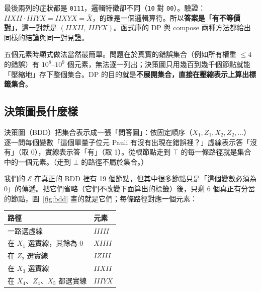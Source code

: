 \documentclass[a4paper,11pt,fontset=none]{ctexart}
\renewcommand{\emph}[1]{\textbf{#1}}
\newcommand{\E}{\mathcal{E}}
\theoremstyle{definition}
\begin{document}
最後兩列的症狀都是 \texttt{0111}，邏輯特徵卻不同（\texttt{10} 對 \texttt{00}）。驗證：$IIXII\cdot IIIYX=IIXYX=\bar X$，的確是一個邏輯算符。所以\textbf{答案是「有不等價對」}，這一對就是 $(IIXII,\ IIIYX)$。函式庫的 DP 與 compose 兩種方法都給出同樣的結論與同一對見證。

五個元素時顯式做法當然最簡單。問題在於真實的錯誤集合（例如所有權重 $\le 4$ 的錯誤）有 $10^8$--$10^9$ 個元素，無法逐一列出；決策圖只用幾百到幾千個節點就能「壓縮地」存下整個集合。DP 的目的就是\emph{不展開集合，直接在壓縮表示上算出標籤集合}。

\subsection{決策圖長什麼樣}

決策圖（BDD）把集合表示成一張「問答圖」：依固定順序（$X_1,Z_1,X_2,Z_2,\dots$）逐一問每個變數「這個單量子位元 Pauli 有沒有出現在錯誤裡？」虛線表示答「沒有」（取 0），實線表示答「有」（取 1）。從根節點走到 $\top$ 的每一條路徑就是集合中的一個元素。（走到 $\bot$ 的路徑不屬於集合。）

我們的 $\E$ 在真正的 BDD 裡有 19 個節點，但其中很多節點只是「這個變數必須為 0」的傳遞。把它們省略（它們不改變下面算出的標籤）後，只剩 6 個真正有分岔的節點，圖~\ref{fig:bdd} 畫的就是它們；每條路徑對應一個元素：

\begin{center}
\small
\begin{tabular}{@{}ll@{}}
\toprule
路徑 & 元素\\
\midrule
一路選虛線 & $IIIII$\\
在 $X_1$ 選實線，其餘為 0 & $XIIII$\\
在 $Z_2$ 選實線 & $IZIII$\\
在 $X_3$ 選實線 & $IIXII$\\
在 $X_4$、$Z_4$、$X_5$ 都選實線 & $IIIYX$\\
\bottomrule
\end{tabular}
\end{center}
\end{document}
